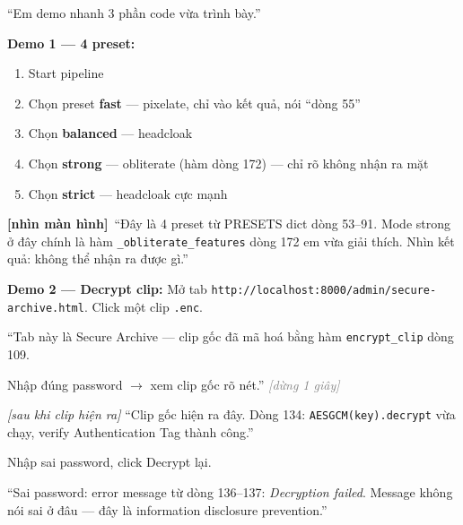 \documentclass[12pt, a4paper]{article}
\newcommand{\pause}{\textcolor{gray}{\textit{[dừng 1 giây]}}}
\newcommand{\screen}{\textcolor{OliveGreen}{\textbf{[nhìn màn hình]}}}
\begin{document}
\begin{say}
``Em demo nhanh 3 phần code vừa trình bày.''
\end{say}

\begin{doact}
\textbf{Demo 1 --- 4 preset:}
\begin{enumerate}
  \item Start pipeline
  \item Chọn preset \textbf{fast} --- pixelate, chỉ vào kết quả, nói ``dòng 55''
  \item Chọn \textbf{balanced} --- headcloak
  \item Chọn \textbf{strong} --- obliterate (hàm dòng 172) --- chỉ rõ không nhận ra mặt
  \item Chọn \textbf{strict} --- headcloak cực mạnh
\end{enumerate}
\end{doact}

\begin{say}
\screen\ ``Đây là 4 preset từ PRESETS dict dòng 53--91.
Mode strong ở đây chính là hàm \texttt{\_obliterate\_features} dòng 172 em vừa giải thích.
Nhìn kết quả: không thể nhận ra được gì.''
\end{say}

\begin{doact}
\textbf{Demo 2 --- Decrypt clip:}
Mở tab \texttt{http://localhost:8000/admin/secure-archive.html}.
Click một clip \texttt{.enc}.
\end{doact}

\begin{say}
``Tab này là Secure Archive --- clip gốc đã mã hoá bằng hàm \texttt{encrypt\_clip} dòng 109.

Nhập đúng password $\to$ xem clip gốc rõ nét.'' \pause

\textit{[sau khi clip hiện ra]} ``Clip gốc hiện ra đây.
Dòng 134: \texttt{AESGCM(key).decrypt} vừa chạy, verify Authentication Tag thành công.''
\end{say}

\begin{doact}
Nhập sai password, click Decrypt lại.
\end{doact}

\begin{say}
``Sai password: error message từ dòng 136--137: \textit{Decryption failed}.
Message không nói sai ở đâu --- đây là information disclosure prevention.''
\end{say}

\end{document}
